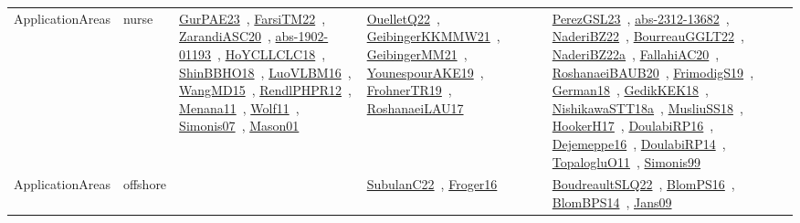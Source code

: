 {\begin{longtable}{lp{3cm}>{\raggedright\arraybackslash}p{6cm}>{\raggedright\arraybackslash}p{6cm}>{\raggedright\arraybackslash}p{8cm}}
ApplicationAreas & nurse & \href{works/GurPAE23.pdf}{GurPAE23}~\cite{GurPAE23}, \href{works/FarsiTM22.pdf}{FarsiTM22}~\cite{FarsiTM22}, \href{works/ZarandiASC20.pdf}{ZarandiASC20}~\cite{ZarandiASC20}, \href{works/abs-1902-01193.pdf}{abs-1902-01193}~\cite{abs-1902-01193}, \href{works/HoYCLLCLC18.pdf}{HoYCLLCLC18}~\cite{HoYCLLCLC18}, \href{works/ShinBBHO18.pdf}{ShinBBHO18}~\cite{ShinBBHO18}, \href{works/LuoVLBM16.pdf}{LuoVLBM16}~\cite{LuoVLBM16}, \href{works/WangMD15.pdf}{WangMD15}~\cite{WangMD15}, \href{works/RendlPHPR12.pdf}{RendlPHPR12}~\cite{RendlPHPR12}, \href{works/Menana11.pdf}{Menana11}~\cite{Menana11}, \href{works/Wolf11.pdf}{Wolf11}~\cite{Wolf11}, \href{works/Simonis07.pdf}{Simonis07}~\cite{Simonis07}, \href{works/Mason01.pdf}{Mason01}~\cite{Mason01} & \href{works/OuelletQ22.pdf}{OuelletQ22}~\cite{OuelletQ22}, \href{works/GeibingerKKMMW21.pdf}{GeibingerKKMMW21}~\cite{GeibingerKKMMW21}, \href{works/GeibingerMM21.pdf}{GeibingerMM21}~\cite{GeibingerMM21}, \href{works/YounespourAKE19.pdf}{YounespourAKE19}~\cite{YounespourAKE19}, \href{works/FrohnerTR19.pdf}{FrohnerTR19}~\cite{FrohnerTR19}, \href{works/RoshanaeiLAU17.pdf}{RoshanaeiLAU17}~\cite{RoshanaeiLAU17} & \href{works/PerezGSL23.pdf}{PerezGSL23}~\cite{PerezGSL23}, \href{works/abs-2312-13682.pdf}{abs-2312-13682}~\cite{abs-2312-13682}, \href{works/NaderiBZ22.pdf}{NaderiBZ22}~\cite{NaderiBZ22}, \href{works/BourreauGGLT22.pdf}{BourreauGGLT22}~\cite{BourreauGGLT22}, \href{works/NaderiBZ22a.pdf}{NaderiBZ22a}~\cite{NaderiBZ22a}, \href{works/FallahiAC20.pdf}{FallahiAC20}~\cite{FallahiAC20}, \href{works/RoshanaeiBAUB20.pdf}{RoshanaeiBAUB20}~\cite{RoshanaeiBAUB20}, \href{works/FrimodigS19.pdf}{FrimodigS19}~\cite{FrimodigS19}, \href{works/German18.pdf}{German18}~\cite{German18}, \href{works/GedikKEK18.pdf}{GedikKEK18}~\cite{GedikKEK18}, \href{works/NishikawaSTT18a.pdf}{NishikawaSTT18a}~\cite{NishikawaSTT18a}, \href{works/MusliuSS18.pdf}{MusliuSS18}~\cite{MusliuSS18}, \href{works/HookerH17.pdf}{HookerH17}~\cite{HookerH17}, \href{works/DoulabiRP16.pdf}{DoulabiRP16}~\cite{DoulabiRP16}, \href{works/Dejemeppe16.pdf}{Dejemeppe16}~\cite{Dejemeppe16}, \href{works/DoulabiRP14.pdf}{DoulabiRP14}~\cite{DoulabiRP14}, \href{works/TopalogluO11.pdf}{TopalogluO11}~\cite{TopalogluO11}, \href{works/Simonis99.pdf}{Simonis99}~\cite{Simonis99}\\
ApplicationAreas & offshore &  & \href{works/SubulanC22.pdf}{SubulanC22}~\cite{SubulanC22}, \href{works/Froger16.pdf}{Froger16}~\cite{Froger16} & \href{works/BoudreaultSLQ22.pdf}{BoudreaultSLQ22}~\cite{BoudreaultSLQ22}, \href{works/BlomPS16.pdf}{BlomPS16}~\cite{BlomPS16}, \href{works/BlomBPS14.pdf}{BlomBPS14}~\cite{BlomBPS14}, \href{works/Jans09.pdf}{Jans09}~\cite{Jans09}\\

\end{longtable}}
